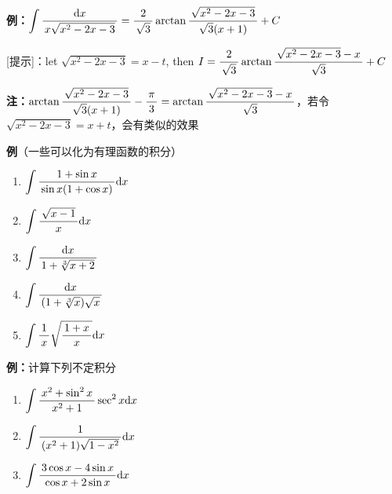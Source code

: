 {\bf 例：}$\dint\df{\d x}{x\sqrt{x^2-2x-3}}=\df2{\sqrt3}
\arctan\df{\sqrt{x^2-2x-3}}{\sqrt3(x+1)}+C$

[提示]：let $\sqrt{x^2-2x-3}=x-t$, then $I=\df2{\sqrt3}\arctan
\df{\sqrt{x^2-2x-3}-x}{\sqrt3}+C$

{\bf 注：}$\arctan\df{\sqrt{x^2-2x-3}}{\sqrt3(x+1)}-\df{\pi}3=\arctan
\df{\sqrt{x^2-2x-3}-x}{\sqrt3}$，若令$\sqrt{x^2-2x-3}=x+t$，会有类似的效果

{\bf 例}（一些可以化为有理函数的积分）
\begin{enumerate}[(1)]
  \setlength{\itemindent}{1cm}
  \item $\dint\df{1+\sin x}{\sin x(1+\cos x)}\d x$ 
  \item $\dint\df{\sqrt{x-1}}{x}\d x$ 
  \item $\dint\df{\d x}{1+\sqrt[3]{x+2}}$ 
  \item $\dint\df{\d x}{(1+\sqrt[3]{x})\sqrt x}$ 
  \item $\dint\df 1x\sqrt{\df{1+x}{x}}\d x$
\end{enumerate}

{\bf 例：}计算下列不定积分
\begin{enumerate}[(1)]
  \setlength{\itemindent}{1cm}
  \item $\dint\df{x^2+\sin^2x}{x^2+1}\sec^2x\d x$
  \item $\dint\df 1{(x^2+1)\sqrt{1-x^2}}\d x$
  \item $\dint\df{3\cos x-4\sin x}{\cos x+2\sin x}\d x$
\end{enumerate}

